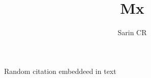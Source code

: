 \documentclass[10pt,a4paper]{article}
\title{Mx}
\author{Sarin CR}
\begin{document}
\maketitle
Random citation embeddeed in text \autocite{veron2001new}

\printbibliography
\end{document}

